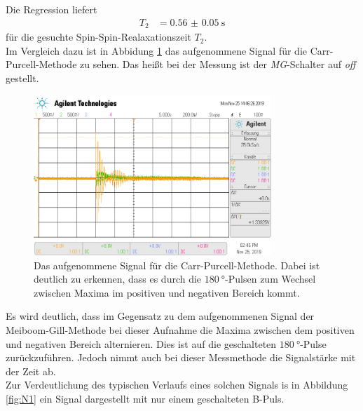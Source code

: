 Die Regression liefert
\begin{align}
  T_2 &=  \SI{0.56(005)}{\second}
\end{align}
für die gesuchte Spin-Spin-Realaxationszeit $T_2$. \\
Im Vergleich dazu ist in Abbidung \ref{fig:t2_off} das aufgenommene Signal für die Carr-Purcell-Methode zu sehen. Das heißt bei der 
Messung ist der \textit{MG}-Schalter auf \textit{off} gestellt.
\begin{figure}[H]
  \centering
  \includegraphics[width=0.8\textwidth]{../data/scope_76.png}
  \caption{Das aufgenommene Signal für die Carr-Purcell-Methode. Dabei ist deutlich zu erkennen, dass es durch die 
  $\SI{180}{\degree}$-Pulsen zum Wechsel zwischen Maxima im positiven und negativen Bereich kommt.}
  \label{fig:t2_off}
\end{figure} \noindent
Es wird deutlich, dass im Gegensatz zu dem aufgenommenen Signal der Meiboom-Gill-Methode bei dieser Aufnahme die Maxima zwischen
dem positiven und negativen Bereich alternieren. Dies ist auf die geschalteten $\SI{180}{\degree}$-Pulse zurückzuführen. Jedoch
nimmt auch bei dieser Messmethode die Signalstärke mit der Zeit ab. \\
Zur Verdeutlichung des typischen Verlaufs eines solchen Signals is in Abbildung \ref{fig:N1} ein Signal dargestellt mit nur einem
geschalteten B-Puls.
